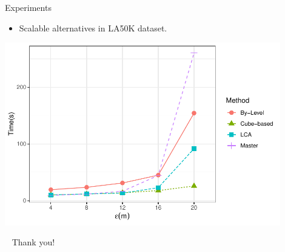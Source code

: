 \documentclass{beamer}
\begin{document}
    \begin{frame}{Experiments}
        \begin{itemize}
            \item Scalable alternatives in LA50K dataset.
        \end{itemize} \vspace{0.25cm}

        \centering
        \includegraphics[width=0.9\textwidth]
                {../thesis/pflocks_paper/figures/plots/08_sequential_parallel/la50k_e}
    \end{frame}

    \begin{frame}{ \ }
        \LARGE Thank you!
    \end{frame}
\end{document}
